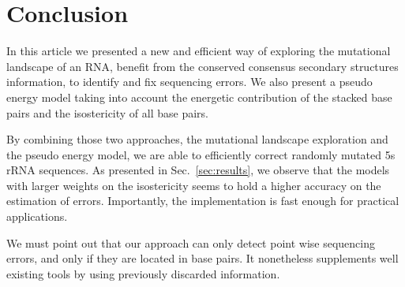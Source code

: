 \section{Conclusion}
\label{sec:conclusion}

In this article we presented a new and efficient way of
exploring the mutational landscape of an RNA, benefit from the
 conserved consensus secondary structures  information,
to identify and fix sequencing errors. We also present a
 pseudo energy model taking into account the energetic contribution 
of the stacked base pairs and the isostericity of all base pairs. 

By combining those two approaches,  the 
mutational landscape exploration and the pseudo energy model,
 we are able  to efficiently 
correct randomly mutated 5s rRNA sequences. 
As presented in Sec.~\ref{sec:results},
we observe that the models
with larger weights on the
isostericity seems to hold a higher accuracy on the estimation of errors.
Importantly, the implementation is fast enough for practical applications.

We must point out that our approach can only detect point wise 
sequencing errors, and only if they are located in base pairs. It 
nonetheless supplements well existing tools by using previously discarded
information.


